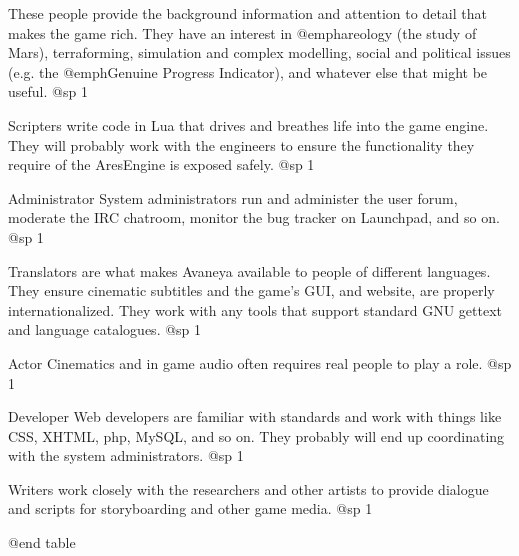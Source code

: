 \itemResearcher
These people provide the background information and attention to detail that makes the game rich. They have an interest in @emph{areology} (the study of Mars), terraforming, simulation and complex modelling, social and political issues (e.g. the @emph{Genuine Progress Indicator}), and whatever else that might be useful.
@sp 1

\itemScripter
Scripters write code in Lua that drives and breathes life into the game engine. They will probably work with the engineers to ensure the functionality they require of the AresEngine is exposed safely.
@sp 1

\itemSystem Administrator
System administrators run and administer the user forum, moderate the IRC chatroom, monitor the bug tracker on Launchpad, and so on.
@sp 1

\itemTranslator
Translators are what makes Avaneya available to people of different languages. They ensure cinematic subtitles and the game's GUI, and website, are properly internationalized. They work with any tools that support standard GNU gettext and language catalogues.
@sp 1

\itemVoice Actor
Cinematics and in game audio often requires real people to play a role.
@sp 1

\itemWeb Developer
Web developers are familiar with standards and work with things like CSS, XHTML, php, MySQL, and so on. They probably will end up coordinating with the system administrators.
@sp 1

\itemWriter
Writers work closely with the researchers and other artists to provide dialogue and scripts for storyboarding and other game media.
@sp 1

@end table

